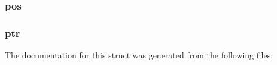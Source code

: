 \subsubsection{\texorpdfstring{pos}{pos}}
{\footnotesize\ttfamily }

\mbox{\label{struct__rio_8io_8buffer_a4d9ad2b37053671b594b237bd061b3f2}} 
\subsubsection{\texorpdfstring{ptr}{ptr}}
{\footnotesize\ttfamily }



The documentation for this struct was generated from the following files\+: